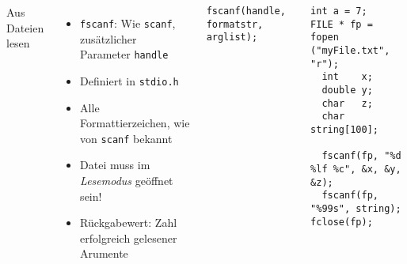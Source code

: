 
\begin{frame}[fragile]
%
\begin{columns}[T]
\begin{Large}
Aus Dateien lesen
\vspace{10pt}
\end{Large}
%
\begin{itemize}
\item \texttt{fscanf}: Wie \texttt{scanf}, zusätzlicher Parameter \texttt{handle}
\item Definiert in \texttt{stdio.h}
\item Alle Formattierzeichen, wie von \texttt{scanf} bekannt
\item Datei muss im \emph{Lesemodus} geöffnet sein!
\item Rückgabewert: Zahl erfolgreich gelesener Arumente
\end{itemize}
%
\begin{codebox}[Syntax]
\begin{verbatim}
fscanf(handle, formatstr, arglist);
\end{verbatim}
\end{codebox}
%
\begin{codebox}[Beispiel]
\begin{verbatim}
int a = 7;
FILE * fp = fopen ("myFile.txt", "r");
  int    x;
  double y;
  char   z;
  char string[100];
  
  fscanf(fp, "%d %lf %c", &x, &y, &z);
  fscanf(fp, "%99s", string);
fclose(fp);
\end{verbatim}
\end{codebox}
\end{columns}
%
\end{frame}


